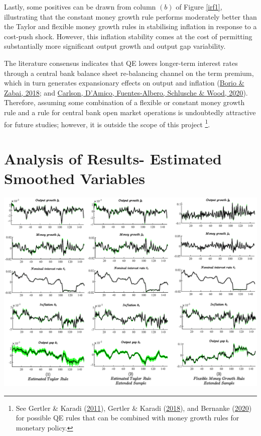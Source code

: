 \documentclass[11pt,preprint, authoryear]{elsarticle}
\let\origfigure\figure
\let\endorigfigure\endfigure
\renewenvironment{figure}[1][2] {
    \expandafter\origfigure\expandafter[H]
} {
    \endorigfigure
}
\numberwithin{equation}{section}
\numberwithin{figure}{section}
\numberwithin{table}{section}
\let\rmarkdownfootnote\footnote%
\def\footnote{\protect\rmarkdownfootnote}
\begin{document}
Lastly, some positives can be drawn from column \((b)\) of Figure
\ref{irf1}, illustrating that the constant money growth rule performs
moderately better than the Taylor and flexible money growth rules in
stabilising inflation in response to a cost-push shock. However, this
inflation stability comes at the cost of permitting substantially more
significant output growth and output gap variability.

The literature consensus indicates that QE lowers longer-term interest
rates through a central bank balance sheet re-balancing channel on the
term premium, which in turn generates expansionary effects on output and
inflation (\protect\hyperlink{ref-borio2018}{Borio \& Zabai, 2018}; and
\protect\hyperlink{ref-carlson2020}{Carlson, D'Amico, Fuentes-Albero,
Schlusche \& Wood, 2020}). Therefore, assuming some combination of a
flexible or constant money growth rule and a rule for central bank open
market operations is undoubtedly attractive for future studies; however,
it is outside the scope of this project \footnote{See Gertler \& Karadi
  (\protect\hyperlink{ref-gertler2011}{2011}), Gertler \& Karadi
  (\protect\hyperlink{ref-gertler2018}{2018}), and Bernanke
  (\protect\hyperlink{ref-bernanke2020}{2020}) for possible QE rules
  that can be combined with money growth rules for monetary policy.}.

\hypertarget{analysis-of-results--estimated-smoothed-variables}{%
\section{Analysis of Results- Estimated Smoothed
Variables}\label{analysis-of-results--estimated-smoothed-variables}}

\begin{figure}
\centering
\hspace*{-1.5cm} 
\includegraphics[width=1.2\textwidth]{code/1step_forecast.eps}
\caption{Smoothed variables –  The black line depicts the estimate of the smoothed variable (“best guess for the observed variable given all observations”), derived from the Kalman smoother at the posterior mean (Bayesian estimation). The green lines represent the deciles of the one step ahead forecast distribution.}
\label{smoothed}
\end{figure}
\end{document}
